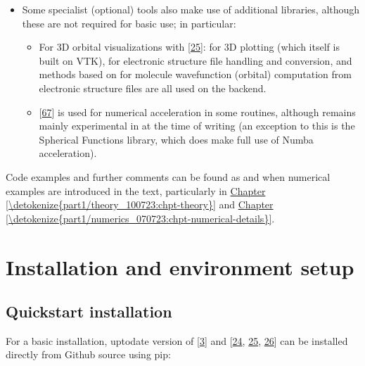 \documentclass[letterpaper,table,10pt,english]{jupyterBook}
\begin{document}
\begin{itemize}
\item {} 
\sphinxAtStartPar
Some specialist (optional) tools also make use of additional libraries, although these are not required for basic use; in particular:
\begin{itemize}
\item {} 
\sphinxAtStartPar
For 3D orbital visualizations with  {[}\hyperlink{cite.backmatter/bibliography:id597}{25}{]}:  for 3D plotting (which itself is built on VTK),  for electronic structure file handling and conversion, and methods based on  for molecule wavefunction (orbital) computation from electronic structure files are all used on the backend.

\item {} 
\sphinxAtStartPar
{} {[}\hyperlink{cite.backmatter/bibliography:id790}{67}{]} is used for numerical acceleration in some routines, although remains mainly experimental in  at the time of writing (an exception to this is the Spherical Functions library, which does make full use of Numba acceleration).

\end{itemize}

\end{itemize}

\sphinxAtStartPar
Code examples and further comments can be found as and when numerical examples are introduced in the text, particularly in \hyperref[\detokenize{part1/theory_100723:chpt-theory}]{Chapter \ref{\detokenize{part1/theory_100723:chpt-theory}}} and \hyperref[\detokenize{part1/numerics_070723:chpt-numerical-details}]{Chapter \ref{\detokenize{part1/numerics_070723:chpt-numerical-details}}}.


\section{Installation and environment set\sphinxhyphen{}up}
\label{\detokenize{part1/platform_intro_070723:installation-and-environment-set-up}}\label{\detokenize{part1/platform_intro_070723:sect-installation}}

\subsection{Quick\sphinxhyphen{}start installation}
\label{\detokenize{part1/platform_intro_070723:quick-start-installation}}
\sphinxAtStartPar
For a basic installation, up\sphinxhyphen{}to\sphinxhyphen{}date version of  {[}\hyperlink{cite.backmatter/bibliography:id668}{3}{]} and  {[}\hyperlink{cite.backmatter/bibliography:id655}{24}, \hyperlink{cite.backmatter/bibliography:id597}{25}, \hyperlink{cite.backmatter/bibliography:id595}{26}{]} can be installed directly from Github source using pip:
\end{document}
